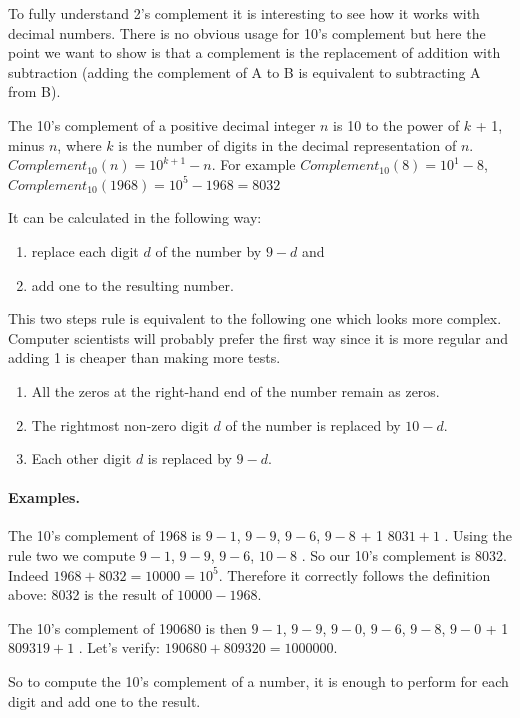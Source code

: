 \documentclass[a4paper,10pt,twoside]{book}
\begin{document}
To fully understand 2's complement it is interesting to see how it works with decimal numbers. There is no obvious usage for 10's complement but here the point we want to show is that a complement is the replacement of addition with subtraction (\ie adding the complement of A to B is equivalent to subtracting A from B).


The 10's complement of a positive decimal integer $n$ is 10 to the power of $k$ + 1, minus $n$, where $k$ is the number of digits in the  decimal representation of $n$. $Complement_{10}(n) = 10^{k+1} - n$.
For example $Complement_{10}(8)= 10^1-8$, $Complement_{10}(1968)=10^{5}-1968=8032$



It can be calculated in the following way: 
\begin{enumerate}
\item replace each digit $d$ of the number by $9-d$ and  
\item add one to the resulting number.
\end{enumerate}

This two steps rule is equivalent to the following one which looks more complex. Computer scientists will probably prefer the first way since it is more regular and adding 1 is cheaper than making more tests.

\begin{enumerate}
\item All the zeros at the right-hand end of the number remain as zeros. 
\item The rightmost non-zero digit $d$ of the number is replaced by $10 - d$. 
\item Each other digit $d$ is replaced by $9 - d$. 
\end{enumerate}

\paragraph{Examples.}
The 10's complement of 1968 is $9-1$, $9-9$, $9-6$, $9-8$ + 1 \ie $8031 + 1$ . 
Using the rule two we compute $9-1$, $9-9$, $9-6$, $10-8$ . So our 10's complement is 8032. Indeed $1968 + 8032 = 10000 = 10^{5}$. Therefore it correctly follows the definition above: 8032 is the result of $10000 - 1968$.

The 10's complement of 190680 is then $9-1$, $9-9$, $9-0$, $9-6$, $9-8$, $9-0$ + 1 \ie $809319 + 1$ . Let's verify: $190680 + 809320 = 1000000$.
 
So to compute the 10's complement of a number, it is enough to perform  for each digit and add one to the result.
\end{document}
